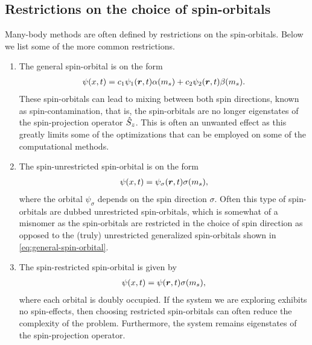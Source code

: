         \subsection{Restrictions on the choice of spin-orbitals}
            \label{subsec:restrictions-on-spin-orbitals}
            Many-body methods are often defined by restrictions on the
            spin-orbitals.
            Below we list some of the more common restrictions.
            \begin{enumerate}
                \item The general spin-orbital is on the form
                    \begin{align}
                        \psi(x, t)
                        = c_1\psi_1(\boldsymbol{r}, t) \alpha(m_s)
                        + c_2\psi_2(\boldsymbol{r}, t) \beta(m_s).
                        \label{eq:general-spin-orbital}
                    \end{align}
                    These spin-orbitals can lead to mixing between both
                    spin directions, known as spin-contamination, that is, the
                    spin-orbitals are no longer eigenstates of the
                    spin-projection operator $\hat{S}_{z}$.
                    This is often an unwanted effect as this greatly limits some
                    of the optimizations that can be employed on some of the
                    computational methods.
                \item The spin-unrestricted spin-orbital is on the form
                    \begin{align}
                        \psi(x, t)
                        = \psi_{\sigma}(\boldsymbol{r}, t) \sigma(m_s),
                        \label{eq:unrestricted-spin-orbital}
                    \end{align}
                    where the orbital $\psi_{\sigma}$ depends on the
                    spin direction $\sigma$.
                    Often this type of spin-orbitals are dubbed unrestricted
                    spin-orbitals, which is somewhat of a misnomer as the
                    spin-orbitals are restricted in the choice of spin direction
                    as opposed to the (truly) unrestricted generalized
                    spin-orbitals shown in \autoref{eq:general-spin-orbital}.
                \item The spin-restricted spin-orbital is given by
                    \begin{align}
                        \psi(x, t)
                        = \psi(\boldsymbol{r}, t) \sigma(m_s),
                        \label{eq:restricted-spin-orbital}
                    \end{align}
                    where each orbital is doubly occupied.
                    If the system we are exploring exhibits no spin-effects,
                    then choosing restricted spin-orbitals can often reduce the
                    complexity of the problem.
                    Furthermore, the system remains eigenstates of the
                    spin-projection operator.
            \end{enumerate}

